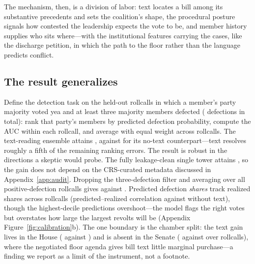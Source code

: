 \documentclass[12pt]{article}
\begin{document}
\begin{table}[t]
\centering
\caption{Counterfactual text edits on two exemplar holdout votes,
scored by the frozen model with all non-text features held at their
actual values. ``Top-5 correct'' is the number of the model's five
likeliest majority defectors who in fact voted nay.}
\label{tab:counterfactual}
{\small }
\end{table}

The mechanism, then, is a division of labor: text locates a bill
among its substantive precedents and sets the coalition's shape, the
procedural posture signals how contested the leadership expects the
vote to be, and member history supplies who sits where---with the
institutional features carrying the cases, like the discharge
petition, in which the path to the floor rather than the language
predicts conflict.

\begin{table}[t]
\centering
\caption{Nearest training-window rollcalls in sentence-embedding
space for three held-out votes of the 118th Congress, with cosine
similarity and each rollcall's realized majority-party defection
share. Neighbors are restricted to votes that precede the exemplar
and lie in the model's training window.}
\label{tab:neighbors}
{\small }
\end{table}

\subsection{The result generalizes}

Define the detection task on the \protRC{} held-out rollcalls in
which a member's party majority voted yea and at least three majority
members defected (\protN{} defections in total): rank that party's
members by predicted defection probability, compute the AUC within
each rollcall, and average with equal weight across rollcalls. The
text-reading ensemble attains \protAUCtext{}, against \protAUCnotext{}
for its no-text counterpart---text resolves roughly a fifth of the
remaining ranking errors. The result is robust in the directions a
skeptic would probe. The fully leakage-clean single tower attains
\protAUCclean, so the gain does not depend on the CRS-curated
metadata discussed in Appendix~\ref{app:audit}. Dropping the
three-defection filter and averaging over all \protRCall{}
positive-defection rollcalls gives \protAUCtextAll{} against
\protAUCnotextAll. Predicted defection \emph{shares} track realized
shares across rollcalls (predicted--realized correlation
 against  without text), though
the highest-decile predictions overshoot---the model flags the right
votes but overstates how large the largest revolts will be
(Appendix Figure~\ref{fig:calibration}b). The one boundary is the
chamber split: the text gain lives in the House
(\protAUCtextHouse{} against \protAUCnotextHouse) and is absent in
the Senate (\protAUCtextSenate{} against \protAUCnotextSenate{} over
\protRCsenate{} rollcalls), where the negotiated floor agenda gives
bill text little marginal purchase---a finding we report as a limit
of the instrument, not a footnote.
\end{document}

